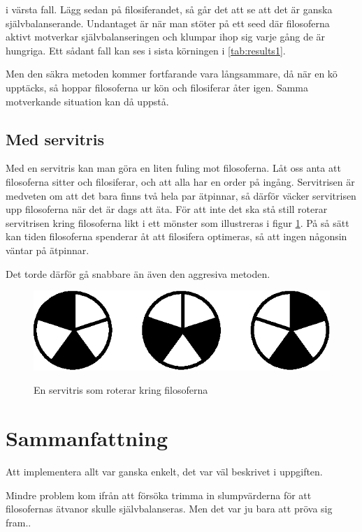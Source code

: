 \documentclass[a4paper, 11pt]{article}
\begin{document}
i värsta fall. Lägg sedan på filosiferandet, så går det att se att det är ganska självbalanserande. Undantaget
är när man stöter på ett seed där filosoferna aktivt motverkar självbalanseringen och klumpar ihop sig varje gång
de är hungriga. Ett sådant fall kan ses i sista körningen i \ref{tab:results1}.

Men den säkra metoden kommer fortfarande vara långsammare, då när en kö upptäcks, så hoppar filosoferna ur kön
och filosiferar åter igen. Samma motverkande situation kan då uppstå.

\subsection{Med servitris}

Med en servitris kan man göra en liten fuling mot filosoferna. Låt oss anta att filosoferna sitter och filosiferar, och att alla har en order på ingång.
Servitrisen är medveten om att det bara finns två hela par ätpinnar, så därför väcker servitrisen upp filosoferna när det är dags att äta.
För att inte det ska stå still roterar servitrisen kring filosoferna likt i ett mönster som illustreras i figur \ref{fig:waiter}.
På så sätt kan tiden filosoferna spenderar åt att filosifera optimeras, så att ingen någonsin väntar på ätpinnar.

Det torde därför gå snabbare än även den aggresiva metoden.

\begin{figure}[!htb]
\centering
\includegraphics[scale=1.0]{waiter.eps}
\label{fig:waiter}
\caption{En servitris som roterar kring filosoferna}
\end{figure}


\section{Sammanfattning}

Att implementera allt var ganska enkelt, det var väl beskrivet i uppgiften.

Mindre problem kom ifrån att försöka trimma in slumpvärderna för att filosofernas ätvanor skulle självbalanseras. Men det var ju bara att pröva sig fram..
\end{document}
